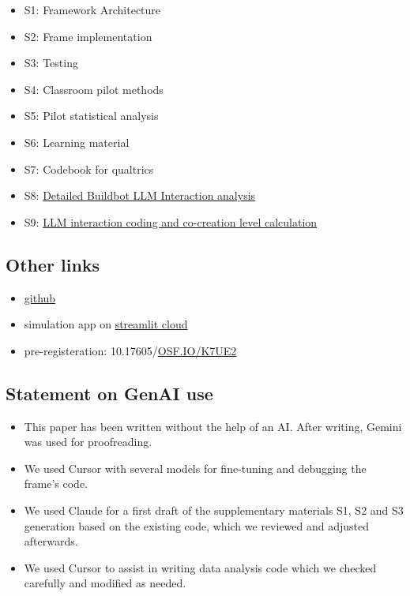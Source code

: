 \documentclass[fleqn,10pt]{wlscirep}
\begin{document}
\begin{itemize}
\item S1: Framework Architecture
\item S2: Frame implementation
\item S3: Testing
\item S4: Classroom pilot methods
\item S5: Pilot statistical analysis
\item S6: Learning material
\item S7: Codebook for qualtrics
\item S8: \href{https://docs.google.com/document/d/1H8ze6IJ8H7I5qsTjTcrK8b4FXwIk0rf9yr8sr4EKXkY/edit?tab=t.0}{Detailed Buildbot LLM Interaction analysis}
\item S9: \href{https://github.com/OlgaMuss/LLM_Frames_Paper/blob/main/Data_analysis/Data/BuildbotAnalysis\%20-\%20LLM\%20analysis.csv}{LLM interaction coding and co-creation level calculation}
\end{itemize}


\subsection*{Other links}

\begin{itemize}
\item \href{https://github.com/OlgaMuss/LLM_Frames_Paper}{github}
\item simulation app on \href{https://buildbot-4tzkvoxzssupnzkb9e6va4.streamlit.app}{streamlit cloud}
\item pre-registeration: 10.17605/\href{http://OSF.IO/K7UE2}{OSF.IO/K7UE2}
\end{itemize}

\subsection*{Statement on GenAI use}

\begin{itemize}
\item This paper has been written without the help of an AI. After writing, Gemini was used for proofreading.
\item We used Cursor with several models for fine-tuning and debugging the frame's code.
\item We used Claude for a first draft of the supplementary materials S1, S2 and S3 generation based on the existing code, which we reviewed and adjusted afterwards.
\item We used Cursor to assist in writing data analysis code which we checked carefully and modified as needed.
\end{itemize}
\end{document}

